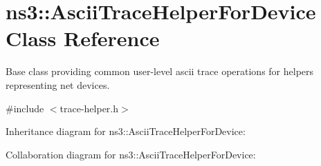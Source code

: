 \hypertarget{classns3_1_1AsciiTraceHelperForDevice}{}\section{ns3\+:\+:Ascii\+Trace\+Helper\+For\+Device Class Reference}
\label{classns3_1_1AsciiTraceHelperForDevice}


Base class providing common user-\/level ascii trace operations for helpers representing net devices.  




{\ttfamily \#include $<$trace-\/helper.\+h$>$}



Inheritance diagram for ns3\+:\+:Ascii\+Trace\+Helper\+For\+Device\+:


Collaboration diagram for ns3\+:\+:Ascii\+Trace\+Helper\+For\+Device\+:
